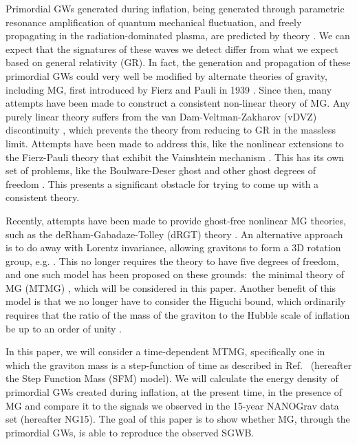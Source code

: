 \documentclass[prd,twocolumn,aps,psfig,nofootinbib,nobibnotes,superscriptaddress,preprintnumbers,times]{revtex4-2}
\begin{document}
Primordial GWs generated during inflation, being generated through parametric resonance amplification of quantum mechanical fluctuation, and freely propagating in the radiation-dominated plasma, are predicted by theory 
\cite{Grishchuk:1976,Grishchuk:1977zz,Starobinsky:1980te,Linde:1981mu,Fabbri:1983us}. We can expect that the signatures of these waves we detect differ from what we expect based on general relativity (GR). In fact, the generation and propagation of these primordial GWs could very well be modified by alternate theories of gravity, including MG, first introduced by Fierz and Pauli in 1939 \cite{Fierz:1939ix}. Since then, many attempts have been made to construct a consistent non-linear theory of MG. Any purely linear theory suffers from the van Dam-Veltman-Zakharov (vDVZ) discontinuity \cite{vanDam:1970vg,Zakharov:1970cc}, which prevents the theory from reducing to GR in the massless limit. Attempts have been made to address this, like the nonlinear extensions to the Fierz-Pauli theory that exhibit the Vainshtein mechanism \cite{Vainshtein:1972sx}. This has its own set of problems, like the Boulware-Deser ghost and other ghost degrees of freedom \cite{Boulware:1972yco,Dubovsky:2004sg}. This presents a significant obstacle for trying to come up with a consistent theory.

Recently, attempts have been made to provide ghost-free nonlinear MG  theories, such as the deRham-Gabadaze-Tolley (dRGT) theory \cite{Hassan:2011tf, Hassan:2011ea, deRham:2010ik,deRham:2010kj}. An alternative approach is to do away with Lorentz invariance, allowing gravitons to form a 3D rotation group, e.g. \cite{Arkani-Hamed:2003pdi, Rubakov:2004eb, Dubovsky:2004sg, Blas:2009my, Rubakov:2008nh, Blas:2007zz, Comelli:2013txa, Langlois:2014jba}. This no longer requires the theory to have five degrees of freedom, and one such model has been proposed on these grounds:\ the minimal theory of MG (MTMG) 
\cite{DeFelice:2015hla, DeFelice:2015moy}, which will be considered in this paper. Another benefit of this model is that we no longer have to consider the Higuchi bound, which ordinarily requires that the ratio of the mass of the graviton to the Hubble scale of inflation be up to an order of unity \cite{Higuchi:1986py}.

In this paper, we will consider a time-dependent MTMG, specifically one in which the graviton mass is a step-function of time as described in Ref.\ \cite{Fujita:2018ehq} (hereafter the Step Function Mass (SFM) model). We will calculate the energy density of primordial GWs created during inflation, at the present time, in the presence of MG and compare it to the signals we observed in the 15-year NANOGrav data set (hereafter NG15). The goal of this paper is to show whether MG, through the primordial GWs, is able to reproduce the observed SGWB.
\end{document}
